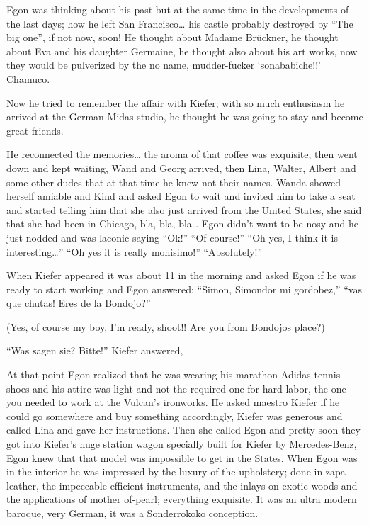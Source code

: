 \documentclass[smalldemyvopaper,11pt,twoside,onecolumn,openright,extrafontsizes]{memoir}
\begin{document}
\ornamentbreak

Egon was thinking about his past but at the same time in the developments of the last days; how he left San Francisco… his castle probably destroyed by “The big one”, if not now, soon! He thought about Madame Brückner, he thought about Eva and his daughter Germaine, he thought also about his art works, now they would be pulverized by the no name, mudder-fucker ‘sonababiche!!’ Chamuco.

Now he tried to remember the affair with Kiefer; with so much enthusiasm he arrived at the German Midas studio, he thought he was going to stay and become great friends. 

He reconnected the memories… the aroma of that coffee was exquisite, then went down and kept waiting, Wand and Georg arrived, then Lina, Walter, Albert and some other dudes that at that time he knew not their names. Wanda showed herself amiable and Kind and asked Egon to wait and invited him to take a seat and started telling him that she also just arrived from the United States, she said that she had been in Chicago, bla, bla, bla… Egon didn’t want to be nosy and he just nodded and was laconic saying “Ok!” “Of course!” “Oh yes, I think it is interesting…” “Oh yes it is really monisimo!” “Absolutely!”

When Kiefer appeared it was about 11 in the morning and asked Egon if he was ready to start working and Egon answered: “Simon, Simondor mi gordobez,” “vas que chutas! Eres de la Bondojo?”

(Yes, of course my boy, I’m ready, shoot!! Are you from Bondojos place?)

“Was sagen sie? Bitte!” Kiefer answered, 

At that point Egon realized that he was wearing his marathon Adidas tennis shoes and his attire was light and not the required one for hard labor, the one you needed to work at the Vulcan’s ironworks. He asked maestro Kiefer if he could go somewhere and buy something accordingly, Kiefer was generous and called Lina and gave her instructions. Then she called Egon and pretty soon they got into Kiefer’s huge station wagon specially built for Kiefer by Mercedes-Benz, Egon knew that that model was impossible to get in the States. When Egon was in the interior he was impressed by the luxury of the upholstery; done in zapa leather, the impeccable efficient instruments, and the inlays on exotic woods and the applications of mother of-pearl; everything exquisite. It was an ultra modern baroque, very German, it was a Sonderrokoko conception.
\end{document}
